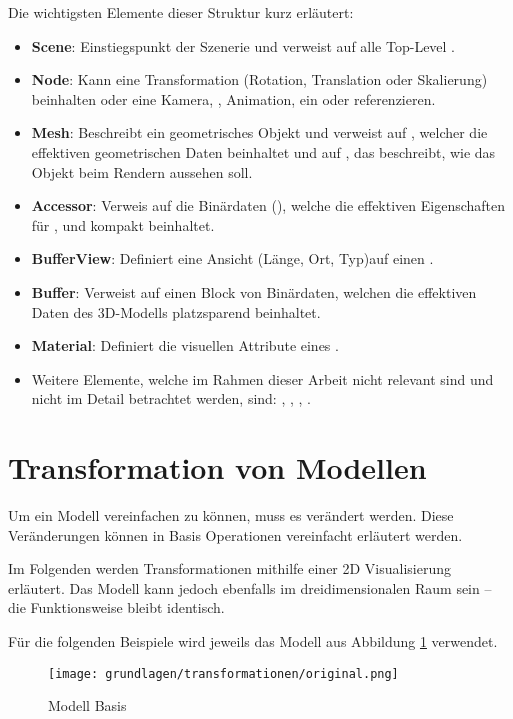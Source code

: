 Die wichtigsten Elemente dieser Struktur kurz erläutert:
\begin{itemize}
  \item \textbf{Scene}: Einstiegspunkt der Szenerie und verweist auf alle Top-Level .
  \item \textbf{Node}: Kann eine Transformation (Rotation, Translation oder Skalierung) beinhalten oder eine Kamera, , Animation, ein  oder  referenzieren.
  \item  \textbf{Mesh}: Beschreibt ein geometrisches Objekt und verweist auf , welcher die effektiven geometrischen Daten beinhaltet und auf , das beschreibt, wie das Objekt beim Rendern aussehen soll.
  \item \textbf{Accessor}: Verweis auf die Binärdaten (), welche die effektiven Eigenschaften für ,  und  kompakt beinhaltet.
  \item \textbf{BufferView}: Definiert eine Ansicht (Länge, Ort, Typ)auf einen .
  \item \textbf{Buffer}: Verweist auf einen Block von Binärdaten, welchen die effektiven Daten des 3D-Modells platzsparend beinhaltet.
  \item \textbf{Material}: Definiert die visuellen Attribute eines .
  \item Weitere Elemente, welche im Rahmen dieser Arbeit nicht relevant sind und nicht im Detail betrachtet werden, sind: , , , .
\end{itemize}

\section{Transformation von Modellen}

Um ein Modell vereinfachen zu können, muss es verändert werden.
Diese Veränderungen können in Basis Operationen vereinfacht erläutert werden.

Im Folgenden werden Transformationen mithilfe einer 2D Visualisierung erläutert. Das Modell kann jedoch ebenfalls im dreidimensionalen Raum sein – die Funktionsweise bleibt identisch.

Für die folgenden Beispiele wird jeweils das Modell aus Abbildung \ref{fig:transformationOriginal} verwendet.

\begin{figure}[H]
  \centering
  \texttt{[image: grundlagen/transformationen/original.png]}
  \caption{Modell Basis}
  \label{fig:transformationOriginal}
\end{figure}

